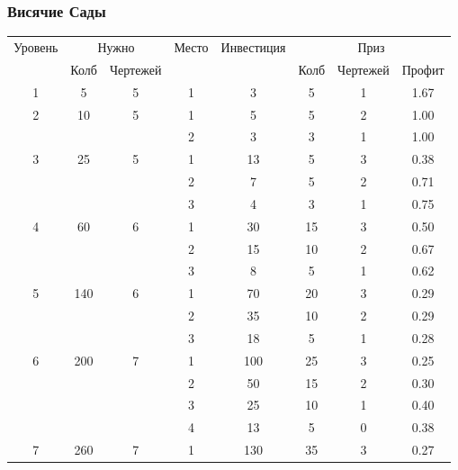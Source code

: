 \subsubsection{Висячие Сады}

\begin{longtable}[c]{|c|c|c|c|c|c|c|c|}
    \hline
    \multirow{ 2}{*}{\small Уровень} &
    \multicolumn{2}{|c|}{\small Нужно} &
    \multirow{ 2}{*}{\small Место} & 
    \multirow{ 2}{*}{\small Инвестиция} & 
    \multicolumn{3}{|c|}{\small Приз} \\\cline{2-3}\cline{6-8}
    &
    {\small Колб} & 
    {\small Чертежей} & 
    & &
    {\small Колб} & 
    {\small Чертежей} & 
    {\small Профит}
    \\\hline\endhead
    \multirow{1}{*}{1} & \multirow{1}{*}{5} & \multirow{1}{*}{5} & 1 & 3 & 5 & 1 & 1.67 \\\hline
    \multirow{2}{*}{2} & \multirow{2}{*}{10} & \multirow{2}{*}{5} & 1 & 5 & 5 & 2 & 1.00 \\\cline{4-8}
    & & & 2 & 3 & 3 & 1 & 1.00 \\\hline
    \multirow{3}{*}{3} & \multirow{3}{*}{25} & \multirow{3}{*}{5} & 1 & 13 & 5 & 3 & 0.38 \\\cline{4-8}
    & & & 2 & 7 & 5 & 2 & 0.71 \\\cline{4-8}
    & & & 3 & 4 & 3 & 1 & 0.75 \\\hline
    \multirow{3}{*}{4} & \multirow{3}{*}{60} & \multirow{3}{*}{6} & 1 & 30 & 15 & 3 & 0.50 \\\cline{4-8}
    & & & 2 & 15 & 10 & 2 & 0.67 \\\cline{4-8}
    & & & 3 & 8 & 5 & 1 & 0.62 \\\hline
    \multirow{3}{*}{5} & \multirow{3}{*}{140} & \multirow{3}{*}{6} & 1 & 70 & 20 & 3 & 0.29 \\\cline{4-8}
    & & & 2 & 35 & 10 & 2 & 0.29 \\\cline{4-8}
    & & & 3 & 18 & 5 & 1 & 0.28 \\\hline
    \multirow{4}{*}{6} & \multirow{4}{*}{200} & \multirow{4}{*}{7} & 1 & 100 & 25 & 3 & 0.25 \\\cline{4-8}
    & & & 2 & 50 & 15 & 2 & 0.30 \\\cline{4-8}
    & & & 3 & 25 & 10 & 1 & 0.40 \\\cline{4-8}
    & & & 4 & 13 & 5 & 0 & 0.38 \\\hline
    \multirow{4}{*}{7} & \multirow{4}{*}{260} & \multirow{4}{*}{7} & 1 & 130 & 35 & 3 & 0.27 \\\cline{4-8}

\end{longtable}
